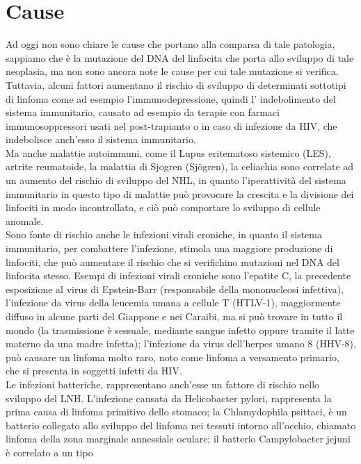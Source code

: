 \section{Cause}
Ad oggi non sono chiare le cause che portano alla comparsa di tale patologia, sappiamo che è la mutazione del 
DNA del linfocita che porta allo sviluppo di tale neoplasia, ma non sono ancora note le cause per cui tale 
mutazione si verifica.\\ 
Tuttavia, alcuni fattori aumentano il rischio di sviluppo di determinati sottotipi di linfoma come ad esempio 
l’immunodepressione, quindi l’ indebolimento del sistema immunitario, causato ad esempio da terapie con farmaci 
immunosoppressori usati nel post-trapianto o in caso di infezione da HIV, che indebolisce anch’esso 
il sistema immunitario.\\ 
Ma anche malattie autoimmuni, come il Lupus eritematoso sistemico (LES), artrite reumatoide, 
la malattia di Sjogren (Sjögren), la celiachia sono correlate ad un aumento del rischio di sviluppo del NHL, 
in quanto l’iperattività del sistema immunitario in questo tipo di malattie può provocare la crescita e la 
divisione dei linfociti in modo incontrollato, 
e ciò può comportare lo sviluppo di cellule anomale\cite{AMERICANCS}.\\
Sono fonte di rischio anche le infezioni virali croniche, in quanto il sistema immunitario, 
per combattere l’infezione, stimola una maggiore produzione di linfociti, che può aumentare il rischio che si 
verifichino mutazioni nel DNA del linfocita stesso. Esempi di infezioni virali croniche sono l’epatite C, 
la precedente esposizione al virus di Epstein-Barr (responsabile della mononucleosi infettiva), 
l'infezione da virus della leucemia umana a cellule T (HTLV-1), maggiormente diffuso in alcune parti del 
Giappone e nei Caraibi, ma si può trovare in tutto il mondo (la trasmissione è sessuale, mediante sangue infetto 
oppure tramite il latte materno da una madre infetta); l’infezione da virus dell'herpes umano 8 (HHV-8), 
può causare un linfoma molto raro, noto come linfoma a versamento primario, che si presenta in soggetti infetti da HIV.\\
Le infezioni batteriche, rappresentano anch’esse un fattore di rischio nello sviluppo del LNH. 
L’infezione causata da Helicobacter pylori, rappresenta la prima causa di linfoma primitivo dello stomaco; 
la Chlamydophila psittaci, è un batterio collegato allo sviluppo del linfoma nei tessuti intorno all’occhio, 
chiamato linfoma della zona marginale annessiale oculare; il batterio Campylobacter jejuni è correlato a un tipo 
